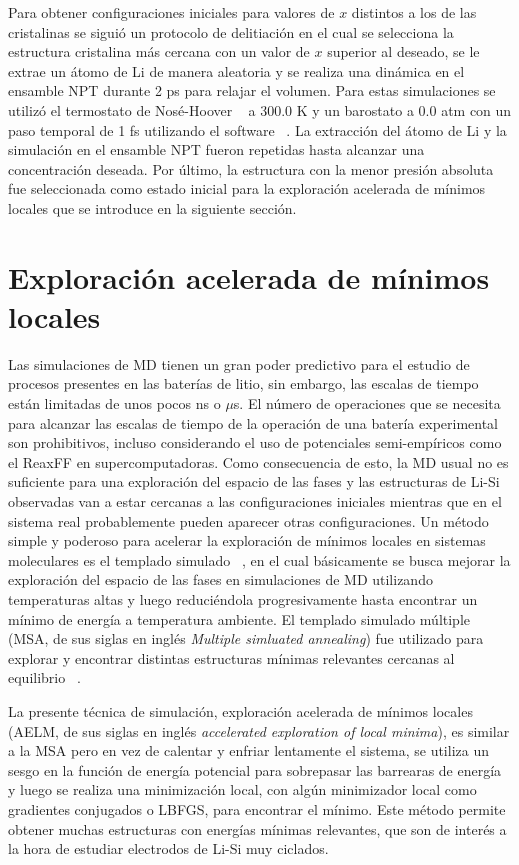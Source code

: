 Para obtener configuraciones iniciales para valores de $x$ distintos a los de las 
cristalinas se siguió un protocolo de delitiación en el cual se selecciona la 
estructura cristalina más cercana con un valor de $x$ superior al deseado,
se le extrae un átomo de Li de manera aleatoria y se realiza una dinámica en el 
ensamble NPT durante 2 ps para relajar el volumen. Para estas simulaciones se 
utilizó el termostato de Nosé-Hoover ~\cite{nose1984a, nose1984b, hoover1985} a
300.0 K y un barostato a 0.0 atm con un paso temporal de 1 fs utilizando el
software  ~\cite{lammps1, lammps2}. La extracción del átomo de Li y
la simulación en el ensamble NPT fueron repetidas hasta alcanzar una concentración
deseada. Por último, la estructura con la menor presión absoluta fue seleccionada
como estado inicial para la exploración acelerada de mínimos locales que se 
introduce en la siguiente sección.


\section{Exploración acelerada de mínimos locales}

Las simulaciones de MD tienen un gran poder predictivo para el estudio de 
procesos presentes en las baterías de litio, sin embargo, las escalas de tiempo
están limitadas de unos pocos ns o $\mu$s. El número de operaciones que se 
necesita para alcanzar las escalas de tiempo de la operación de una batería 
experimental son prohibitivos, incluso considerando el uso de potenciales 
semi-empíricos como el ReaxFF en supercomputadoras. Como consecuencia de esto,
la MD usual no es suficiente para una exploración del espacio de las fases y las
estructuras de Li-Si observadas van a estar cercanas a las configuraciones 
iniciales mientras que en el sistema real probablemente pueden aparecer otras
configuraciones. Un método simple y poderoso para acelerar la exploración de 
mínimos locales en sistemas moleculares es el templado simulado 
~\cite{kirkpatrick1983}, en el cual básicamente se busca mejorar la exploración
del espacio de las fases en simulaciones de MD utilizando temperaturas altas y
luego reduciéndola progresivamente hasta encontrar un mínimo de energía a 
temperatura ambiente. El templado simulado múltiple (MSA, de sus siglas en inglés 
\textit{Multiple simluated annealing}) fue utilizado para explorar y encontrar
distintas estructuras mínimas relevantes cercanas al equilibrio ~\cite{hao2015}.

La presente técnica de simulación, exploración acelerada de mínimos locales (AELM,
de sus siglas en inglés \textit{accelerated exploration of local minima}), es 
similar a la MSA pero en vez de calentar y enfriar lentamente el sistema, se 
utiliza un sesgo en la función de energía potencial para sobrepasar las barrearas
de energía y luego se realiza una minimización local, con algún minimizador local 
como gradientes conjugados o LBFGS, para encontrar el mínimo. Este método permite 
obtener muchas estructuras con energías mínimas relevantes, que son de interés a 
la hora de estudiar electrodos de Li-Si muy ciclados.

